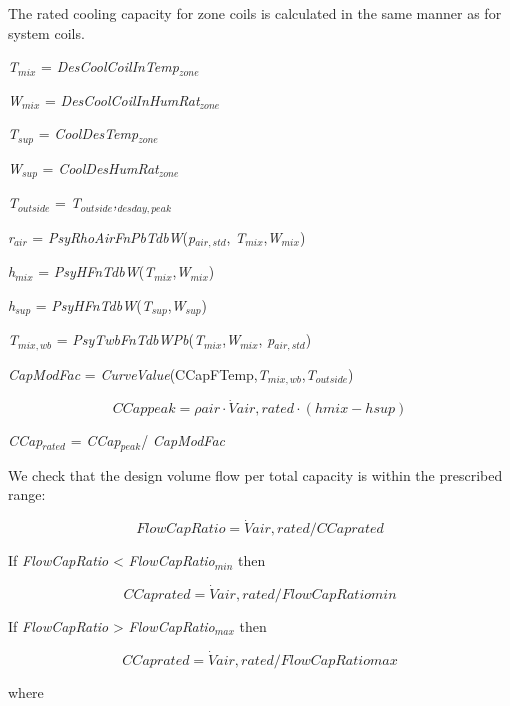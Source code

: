 The rated cooling capacity for zone coils is calculated in the same manner as for system coils.

\emph{T\(_{mix}\)} = \emph{DesCoolCoilInTemp\(_{zone}\)}

\emph{W\(_{mix}\)} = \emph{DesCoolCoilInHumRat\(_{zone}\)}

\emph{T\(_{sup}\)} = \emph{CoolDesTemp\(_{zone}\)}

\emph{W\(_{sup}\)} = \emph{CoolDesHumRat\(_{zone}\)}

\emph{T\(_{outside}\)} = \emph{T\(_{outside}\),\(_{desday,peak}\)}

\emph{r\(_{air}\)} = \emph{PsyRhoAirFnPbTdbW}(\emph{p\(_{air,std}\)}, \emph{T\(_{mix}\)},\emph{W\(_{mix}\)})

\emph{h\(_{mix}\)} = \emph{PsyHFnTdbW}(\emph{T\(_{mix}\)},\emph{W\(_{mix}\)})

\emph{h\(_{sup}\)} = \emph{PsyHFnTdbW}(\emph{T\(_{sup}\)},\emph{W\(_{sup}\)})

\emph{T\(_{mix,wb}\)} = \emph{PsyTwbFnTdbWPb}(\emph{T\(_{mix}\)},\emph{W\(_{mix}\)}, \emph{p\(_{air,std}\)})

\emph{CapModFac} = \emph{CurveValue}(CCapFTemp,\emph{T\(_{mix,wb}\)},\emph{T\(_{outside}\)})

\begin{equation}
CCappeak = \rho air\cdot \dot Vair,rated\cdot (hmix - hsup)
\end{equation}

\emph{CCap\(_{rated}\)} = \emph{CCap\(_{peak}\)}/ \emph{CapModFac}

We check that the design volume flow per total capacity is within the prescribed range:

\begin{equation}
FlowCapRatio = \dot Vair,rated/CCaprated
\end{equation}

If \emph{FlowCapRatio} \textless{} \emph{FlowCapRatio\(_{min}\)} then

\begin{equation}
CCaprated = \dot Vair,rated/FlowCapRatiomin
\end{equation}

If \emph{FlowCapRatio} \textgreater{} \emph{FlowCapRatio\(_{max}\)} then

\begin{equation}
CCaprated = \dot Vair,rated/FlowCapRatiomax
\end{equation}

where

